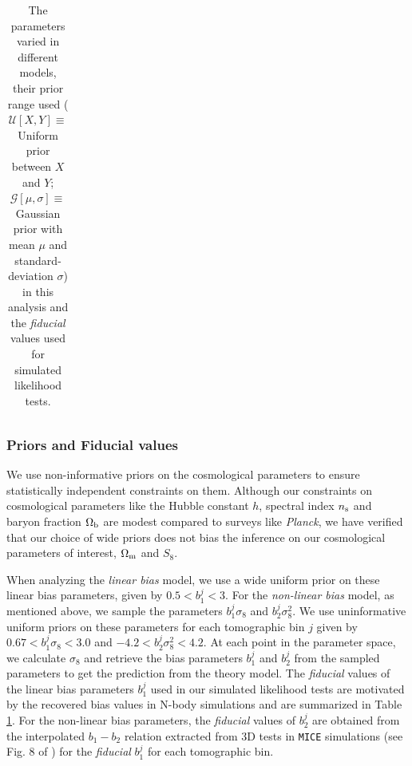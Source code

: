 \documentclass[aps, prd,twocolumn,superscriptaddress,nofootinbib,preprintnumbers]{revtex4-1}
\newcommand{\mice}{\texttt{MICE} }
\newcommand{\IR}[1]{{\color{red}[\textbf{Note for IR}: #1]}}
\begin{document}
\begin{table}[H]
\begin{tabular}{|c| c c c|}
\hline
\end{tabular}
\caption{The parameters varied in different models, their prior range used ($\mathcal{U}[X, Y] \equiv$ Uniform prior between $X$ and $Y$; $\mathcal{G}[\mu, \sigma] \equiv$ Gaussian prior with mean $\mu$ and standard-deviation $\sigma$) in this analysis and the \textit{fiducial} values used for simulated likelihood tests.}
\label{tab:params_all}
\end{table}

\subsubsection{Priors and Fiducial values}
\label{sec:prior}


We use non-informative priors on the cosmological parameters to ensure statistically independent constraints on them. Although our constraints on cosmological parameters like the Hubble constant $h$, spectral index $n_{\rm s}$ and baryon fraction $\Omega_{\rm b}$ are modest compared to surveys like \textit{Planck}, we have verified that our choice of wide priors does not bias the inference on our cosmological parameters of interest, $\Omega_{\rm m}$ and $S_8$. 

When analyzing the \textit{linear bias} model, we use a wide uniform prior on these linear bias parameters, given by $0.5 < b^{j}_1 < 3$. For the \textit{non-linear bias} model, as mentioned above, we sample the parameters $b^{j}_1 \sigma_8$ and $b^{j}_2 \sigma^2_8$. We use uninformative uniform priors on these parameters for each tomographic bin $j$ given by $0.67 < b^{j}_1 \sigma_8 < 3.0$ and $-4.2 < b^{j}_2 \sigma^2_8 < 4.2$. At each point in the parameter space, we calculate  $\sigma_8$ and retrieve the bias parameters $b^{j}_1$ and $b^{j}_2$ from the sampled parameters to get the prediction from the theory model. The \textit{fiducial} values of the linear bias parameters $b^{j}_1$ used in our simulated likelihood tests are motivated by the  recovered bias values in N-body simulations and are summarized in Table \ref{tab:params_all}. 
For the non-linear bias parameters, the \textit{fiducial} values of $b^{j}_2$ are obtained from the interpolated $b_1-b_2$ relation extracted from 3D tests in \mice simulations (see Fig. 8 of \citet*{p2020perturbation}) for the \textit{fiducial} $b^j_1$ for each tomographic bin.
\end{document}
